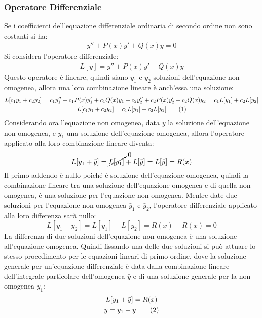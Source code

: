 \documentclass{article}
\numberwithin{equation}{subsection}
\newcommand{\tageq}{\tag{\stepcounter{equation}\theequation}}
\begin{document}
\subsubsection{Operatore Differenziale}

Se i coefficienti dell'equazione differenziale ordinaria di secondo ordine non sono costanti si ha:
\begin{gather}
    y''+P(x)y'+Q(x)y=0
\end{gather}
Si considera l'operatore differenziale:
\begin{gather*}
    L[y]=y''+P(x)y'+Q(x)y
\end{gather*}
Questo operatore è lineare, quindi siano $y_1$ e $y_2$ soluzioni dell'equazione non omogenea, allora una loro combinazione lineare è anch'essa una soluzione:
\begin{gather*}
    L[c_1y_1
    +c_2y_2]=c_1y_1''+c_1P(x)y_1'+c_1Q(x)y_1+c_2y_2''+c_2P(x)y_2'+c_2Q(x)y_2=c_1L[y_1]+c_2L[y_2]\\
    L[c_1y_1+c_2y_2]=c_1L[y_1]+c_2L[y_2]\tageq
\end{gather*}
Considerando ora l'equazione non omogenea, data $\bar{y}$ la soluzione dell'equazione non omogenea, e $y_1$ una soluzione dell'equazione omogenea, allora l'operatore applicato alla loro combinazione lineare diventa:
\begin{equation}
    L[y_1+\bar{y}]=\cancelto{0}{L[y_1]}+L[\bar{y}]=L[\bar{y}]=R(x)
\end{equation}
Il primo addendo è nullo poiché è soluzione dell'equazione omogenea, quindi la combinazione lineare tra una soluzione dell'equazione omogenea e di quella non omogenea, è una soluzione per l'equazione non omogenea.
Mentre date due soluzioni per l'equazione non omogenea $\bar{y}_1$ e $\bar{y}_2$, l'operatore differenziale applicato alla loro differenza sarà nullo:
\begin{equation}
    L[\bar{y}_1-\bar{y_2}]=L[\bar{y}_1]-L[\bar{y}_2]=R(x)-R(x)=0
\end{equation}
La differenza di due soluzioni dell'equazione non omogenea è una soluzione all'equazione omogenea. Quindi fissando una delle due soluzioni si può attuare lo stesso procedimento per le equazioni lineari di primo ordine, dove 
la soluzione generale per un'equazione differenziale è data dalla combinazione lineare dell'integrale particolare dell'omogenea $\bar{y}$ e di una soluzione generale per la non omogenea $y_1$:
\begin{gather*}
    L[y_1+\bar{y}]=R(x)\\
    y=y_1+\bar{y}\tageq
\end{gather*}
\end{document}
